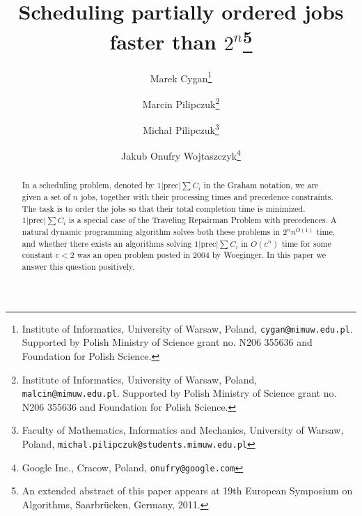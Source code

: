 \documentclass{article}
\theoremstyle{definition}
\begin{document}
\newcommand{\schedname}{{\sc{SCHED}}\xspace}
\newcommand{\schedlongname}{$1|\textrm{prec}|\sum C_i$\xspace}
\newcommand{\czas}[1]{t(#1)}
\newcommand{\koszt}[1]{T(#1)}
\newcommand{\tudu}[1]{{\bf{TODO: #1}}}
\newcommand{\eps}{\varepsilon}
\newcommand{\pinezka}{\textrm{nil}}
\newcommand{\pred}{{\ensuremath{pred}}}
\newcommand{\succc}{{\ensuremath{succ}}}
\renewcommand{\subset}{\subseteq}
\newcommand{\Oh}{\ensuremath{O}}
\newcommand{\Ohstar}{\ensuremath{\Oh^\ast}}

\newcommand{\Wvc}{M}
\newcommand{\Whalf}{W_{\mathrm{half}}}
\newcommand{\Wquarter}{W_{\mathrm{quarter}}}
\newcommand{\matching}{\mathcal{M}}

\newcommand{\defproblemnoparam}[3]{
  \vspace{1mm}
\noindent\fbox{
  \begin{minipage}{\textwidth}  
  #1 \\ 
  {\bf{Input:}} #2  \\
  {\bf{Task:}} #3
  \end{minipage}
  }
  \vspace{1mm}
}


\title{Scheduling partially ordered jobs faster than $2^n$\thanks{An extended abstract of this paper appears at 19th European Symposium on Algorithms, Saarbr\"{u}cken, Germany, 2011.}}

  \author{Marek Cygan\thanks{Institute of Informatics, University of Warsaw, Poland, \texttt{cygan@mimuw.edu.pl}. Supported by Polish Ministry of Science grant no. N206 355636 and Foundation for Polish Science.} \and
	Marcin Pilipczuk\thanks{Institute of Informatics, University of Warsaw, Poland, \texttt{malcin@mimuw.edu.pl}. Supported by Polish Ministry of Science grant no. N206 355636 and Foundation for Polish Science.} \and
	Micha\l{} Pilipczuk\thanks{Faculty of Mathematics, Informatics and Mechanics, University of Warsaw, Poland, \texttt{michal.pilipczuk@students.mimuw.edu.pl}} \and
	Jakub Onufry Wojtaszczyk\thanks{Google Inc., Cracow, Poland, \texttt{onufry@google.com}}}

\date{}

\maketitle

\begin{abstract}
In a scheduling problem, denoted by \schedlongname in the Graham notation,
we are given a set of $n$ jobs, together with their processing
times and precedence constraints. The task is to order the jobs so that their total completion time is minimized.
\schedlongname is a special case of the Traveling Repairman Problem with precedences.
A natural dynamic programming algorithm solves both these problems in $2^n n^{\Oh(1)}$ time, and whether
there exists an algorithms solving \schedlongname{} in $\Oh(c^n)$ time for some constant $c<2$
was an open problem posted in 2004 by Woeginger. In this paper we answer this question positively.
\end{abstract}
\end{document}
